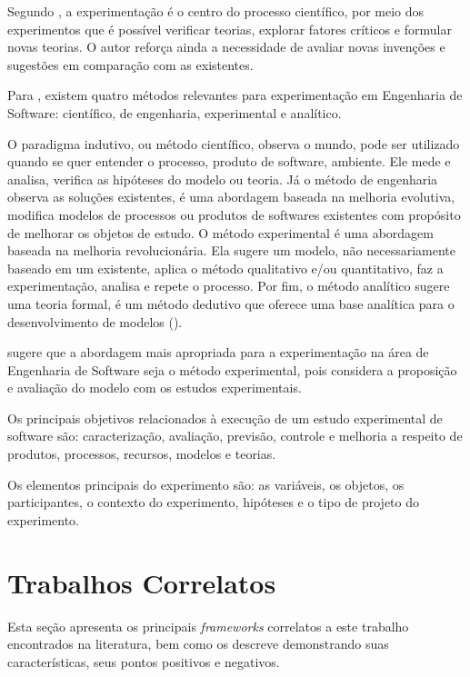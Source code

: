 Segundo \cite{travassos:2002}, a experimentação é o centro do processo científico, por meio dos experimentos que é possível verificar teorias, explorar fatores críticos e formular novas teorias. O autor reforça ainda a necessidade de avaliar novas invenções e sugestões em comparação com as existentes.

Para \cite{wohlin:2000}, existem quatro métodos relevantes para experimentação em Engenharia de Software: científico, de engenharia, experimental e analítico. 

O paradigma indutivo, ou método científico, observa o mundo, pode ser utilizado quando se quer entender o processo, produto de software, ambiente. Ele mede e analisa, verifica as hipóteses do modelo ou teoria.  Já o método de engenharia observa as soluções existentes, é uma abordagem baseada na melhoria evolutiva, modifica modelos de processos ou produtos de softwares existentes com propósito de melhorar os objetos de estudo. O método experimental é uma abordagem baseada na melhoria revolucionária. Ela sugere um modelo, não necessariamente baseado em um existente, aplica o método qualitativo e/ou quantitativo, faz a experimentação, analisa e repete o processo. Por fim, o método analítico sugere uma teoria formal, é um método dedutivo que oferece uma base analítica para o desenvolvimento de modelos (\cite{travassos:2002}).

\cite{travassos:2002} sugere que a abordagem mais apropriada para a experimentação na área de Engenharia de Software seja o método experimental, pois considera a proposição e avaliação do modelo com os estudos experimentais.

Os principais objetivos relacionados à execução de um estudo experimental de software são: caracterização, avaliação, previsão, controle e melhoria a respeito de produtos, processos, recursos, modelos e teorias.

Os elementos principais do experimento são: as variáveis, os objetos, os participantes, o contexto do experimento, hipóteses e o tipo de projeto do experimento.

\section{Trabalhos Correlatos}

\noindent Esta seção apresenta os principais \textit{frameworks} correlatos a este trabalho encontrados na literatura, bem como os descreve  demonstrando suas características, seus pontos positivos e negativos.



